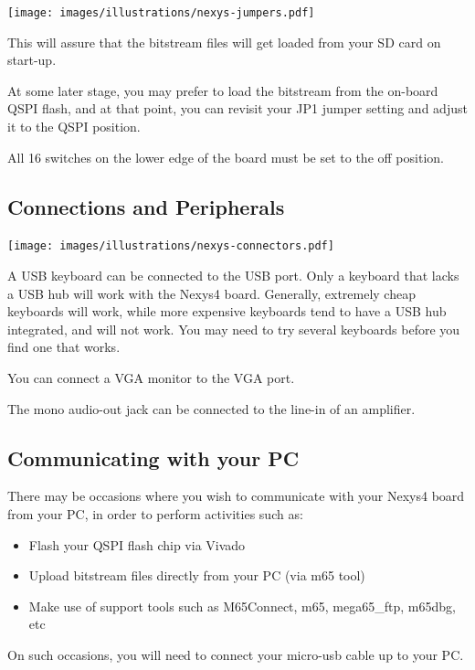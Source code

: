 \begin{center}
  \texttt{[image: images/illustrations/nexys-jumpers.pdf]}
\end{center}

This will assure that the bitstream files will get loaded from your SD card on start-up.

At some later stage, you may prefer to load the bitstream from the on-board QSPI flash, and at that point, you can revisit your JP1 jumper setting and adjust it to the QSPI position.


All 16 switches on the lower edge of the board must be set to the off position.


\subsection{Connections and Peripherals}

\texttt{[image: images/illustrations/nexys-connectors.pdf]}

A USB keyboard can be connected to the USB port. Only a keyboard that lacks a USB hub will work with the Nexys4 board.  Generally, extremely cheap keyboards will work, while more expensive keyboards tend to have a USB hub integrated, and will not work.  You may need to try several keyboards before you find one that works.

You can connect a VGA monitor to the VGA port.

The mono audio-out jack can be connected to the line-in of an amplifier.


\subsection{Communicating with your PC}

There may be occasions where you wish to communicate with your Nexys4 board from your PC, in order to perform activities such as:

\begin{itemize}
  \item Flash your QSPI flash chip via Vivado
  \item Upload bitstream files directly from your PC (via m65 tool)
  \item Make use of support tools such as M65Connect, m65, mega65\_ftp, m65dbg, etc
\end{itemize}

On such occasions, you will need to connect your micro-usb cable up to your PC.

